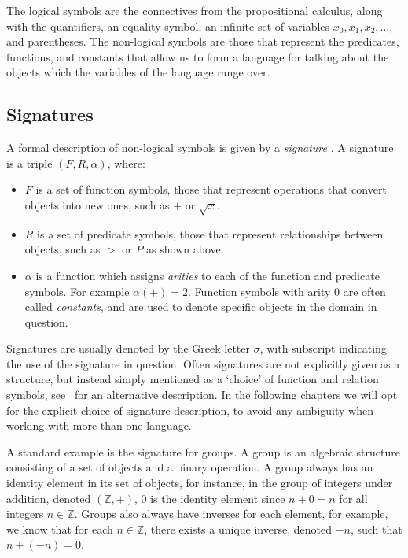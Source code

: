 \documentclass[11pt]{report}
\theoremstyle{definition}
\theoremstyle{theorem}
\theoremstyle{lemma}
\begin{document}
The logical symbols are the connectives from the propositional calculus, along with the quantifiers, an equality symbol, an infinite set of variables $x_0, x_1, x_2,\ldots$, and parentheses.
The non-logical symbols are those that represent the predicates, functions, and constants that allow us to form a language for talking about the objects which the variables of the language range over.

\subsection{Signatures}
A formal description of non-logical symbols is
given by a \emph{signature} \cite[ch. 1.1]{selinger}. A signature is a triple $(F,R,\alpha)$, where:
\begin{itemize}
\item $F$ is a set of function symbols, those that represent operations that convert objects into new ones, such as $+$ or $\sqrt{x}$.
\item $R$ is a set of predicate symbols, those that represent relationships between objects, such as $>$ or $P$ as shown above.
\item $\alpha$ is a function which assigns \emph{arities} to each of the function and predicate symbols.
For example $\alpha(+) = 2$. Function symbols with arity $0$ are often called \emph{constants}, and are used to denote specific objects in the domain in question.
\end{itemize}
Signatures are usually denoted by the Greek letter $\sigma$, with subscript indicating the use of the signature in question.
Often signatures are not explicitly given as a structure, but instead simply mentioned as a `choice' of function and relation symbols, see~\cite{shortermodel} for an alternative description. 
In the following chapters we will opt for the explicit choice of signature description, to avoid any ambiguity when working with more than one language.

A standard example is the signature for groups.
A group is an algebraic structure consisting of a set of objects and a binary operation.
A group always has an identity element in its set of objects, for instance, in the group of integers under addition, denoted $(\mathbb{Z}, +)$, $0$ is the identity element since $n + 0 = n$ for all integers $n\in\mathbb{Z}$.
Groups also always have inverses for each element, for example, we know that for each $n\in\mathbb{Z}$, there exists a unique inverse, denoted $-n$, such that $n + (-n) = 0$.
\end{document}
